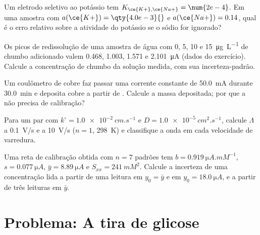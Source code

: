 \begin{exercise}[$\star\star$]\label{exo:b3:electrode-kinetics:8}
Um eletrodo seletivo ao potássio tem $K_{\ce{K+},\ce{Na+}} = \num{2e-4}$. Em uma amostra com $a(\ce{K+}) =
\qty{4.0e-3}{}$ e $a(\ce{Na+}) = 0.14$, qual é o erro relativo sobre a atividade do potássio se o
sódio for ignorado?
\end{exercise}

\begin{exercise}[$\star\star$]\label{exo:b3:electrode-kinetics:9}
Os picos de redissolução de uma amostra de água com 0, 5, 10 e \qty{15}{\micro g.L^{-1}} de chumbo
adicionado valem 0.468, 1.003, 1.571 e \qty{2.101}{\micro A} (dados do exercício). Calcule a
concentração de chumbo da solução medida, com sua incerteza-padrão.
\end{exercise}

\begin{exercise}[$\star\star\star$]\label{exo:b3:electrode-kinetics:10}
Um coulômetro de cobre faz passar uma corrente constante de \qty{50.0}{mA} durante \qty{30.0}{min} e deposita
cobre a partir de . Calcule a massa depositada; por que a  não
precisa de calibração?
\end{exercise}

\begin{exercise}[$\star\star\star$]\label{exo:b3:electrode-kinetics:11}
Para um par com $k^\circ = \qty{1.0e-2}{cm.s^{-1}}$ e $D = \qty{1.0e-5}{cm^2.s^{-1}}$, calcule $\Lambda$ a \qty{0.1}{V/s}
e a \qty{10}{V/s} ($n = 1$, \qty{298}{K}) e classifique a onda em cada velocidade de varredura.
\end{exercise}

\begin{exercise}[$\star\star\star$]\label{exo:b3:electrode-kinetics:12}
Uma reta de calibração obtida com $n = 7$ padrões tem $b = \qty{0.919}{\micro A.mM^{-1}}$, $s = \qty{0.077}{\micro A}$,
$\bar y = \qty{8.89}{\micro A}$ e $S_{xx} = \qty{241}{mM^2}$. Calcule a incerteza de uma concentração lida
a partir de uma leitura em $y_0 = \bar y$ e em $y_0 = \qty{18.0}{\micro A}$, e a partir de três leituras em $\bar y$.
\end{exercise}

\section{Problema: A tira de glicose}

